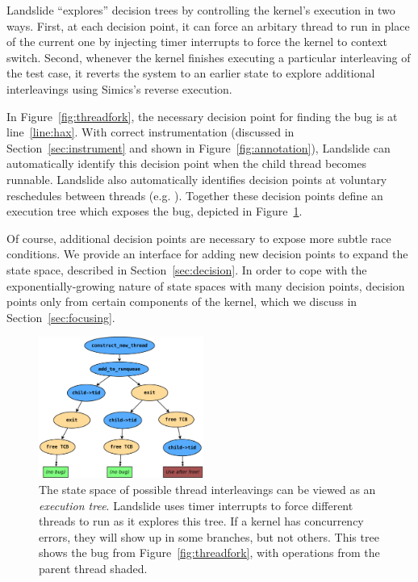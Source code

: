 Landslide ``explores'' decision trees by controlling the kernel's execution in two ways.
First, at each decision point, it can force an arbitary thread to run in place of the current one by injecting timer interrupts to force the kernel to context switch.
Second, whenever the kernel finishes executing a particular interleaving of the test case, it reverts the system to an earlier state to explore additional interleavings using Simics's reverse execution.

In Figure~\ref{fig:threadfork}, the necessary decision point for finding the bug is at line~\ref{line:hax}. With correct instrumentation (discussed in Section~\ref{sec:instrument} and shown in Figure~\ref{fig:annotation}), Landslide can automatically identify this decision point when the child thread becomes runnable.
Landslide also automatically identifies decision points at voluntary reschedules between threads (e.g. ). Together these decision points define an execution tree which exposes the bug, depicted in Figure~\ref{fig:tree}.

Of course, additional decision points are necessary to expose more subtle race conditions. We provide an interface for adding new decision points to expand the state space, described in Section~\ref{sec:decision}.
In order to cope with the exponentially-growing nature of state spaces with many decision points,
decision points only from certain components of the kernel, which we discuss in Section~\ref{sec:focusing}.

\begin{figure}[t]
\includegraphics[width=0.48\textwidth]{threadfork/threadfork.pdf}
\caption{The state space of possible thread interleavings can be viewed as an {\em execution tree}.
Landslide uses timer interrupts to force different threads to run as it explores this tree.
If a kernel has concurrency errors, they will show up in some branches, but not others.
This tree shows the bug from Figure~\ref{fig:threadfork}, with operations from the parent thread shaded.
}
\label{fig:tree}
\end{figure}

